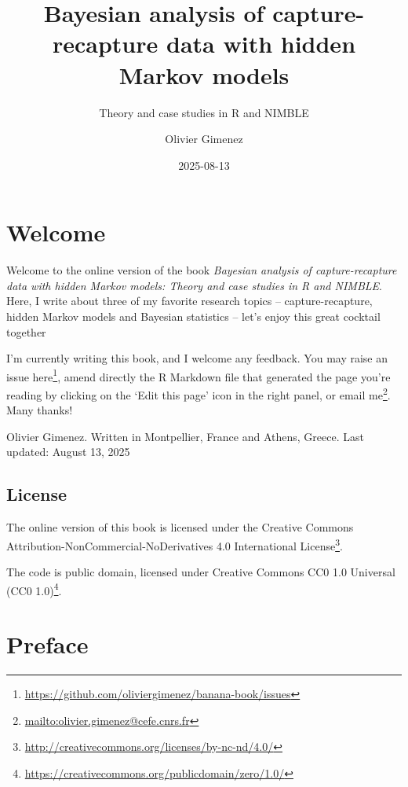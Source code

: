 \documentclass[
  12pt,
]{krantz}
\title{Bayesian analysis of capture-recapture data with hidden Markov models}
\subtitle{Theory and case studies in R and NIMBLE}
\author{Olivier Gimenez}
\date{2025-08-13}
\renewcommand{\href}[2]{#2\footnote{\url{#1}}}
\begin{document}
\maketitle

\thispagestyle{empty}

\setlength{\abovedisplayskip}{-5pt}
\setlength{\abovedisplayshortskip}{-5pt}

{
\hypersetup{linkcolor=}
\setcounter{tocdepth}{2}
\tableofcontents
}
\listoffigures
\listoftables
\chapter*{Welcome}\label{welcome}


Welcome to the online version of the book \emph{Bayesian analysis of capture-recapture data with hidden Markov models: Theory and case studies in R and NIMBLE}. Here, I write about three of my favorite research topics -- capture-recapture, hidden Markov models and Bayesian statistics -- let's enjoy this great cocktail together 🍹

I'm currently writing this book, and I welcome any feedback. You may raise an issue \href{https://github.com/oliviergimenez/banana-book/issues}{here}, amend directly the R Markdown file that generated the page you're reading by clicking on the `Edit this page' icon in the right panel, or \href{mailto:olivier.gimenez@cefe.cnrs.fr}{email me}. Many thanks!

Olivier Gimenez. Written in Montpellier, France and Athens, Greece.
Last updated: August 13, 2025

\section*{License}\label{license}


The online version of this book is licensed under the \href{http://creativecommons.org/licenses/by-nc-nd/4.0/}{Creative Commons Attribution-NonCommercial-NoDerivatives 4.0 International License}.

The code is public domain, licensed under \href{https://creativecommons.org/publicdomain/zero/1.0/}{Creative Commons CC0 1.0 Universal (CC0 1.0)}.

\chapter*{Preface}\label{preface}
\end{document}
